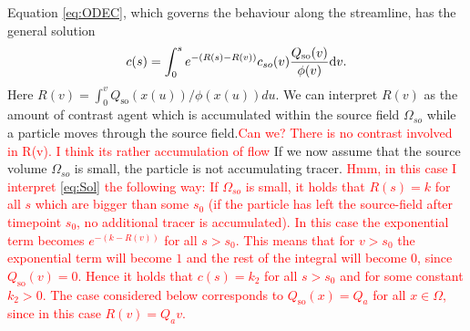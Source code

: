 \documentclass[paper=a4, fontsize=11pt,parskip=half,headings=small]{scrartcl}
\newcommand{\Qso}{Q_{\mathrm{so}}}
\begin{document}
Equation \eqref{eq:ODEC}, which governs the behaviour along the streamline, has the general solution
\begin{equation}\label{eq:Sol}
	c(s) = \int_{0}^{s} e^{-(R(s)-R(v))}c_{so}(v)\frac{\Qso(v)}{\phi(v)} \diff v.
\end{equation}
Here $R(v)=\int_{0}^v\Qso(x(u))/\phi(x(u)) d u$.
We can interpret $R(v)$ as the amount of contrast agent which is accumulated within the source field $\Omega_{so}$ while a particle moves through the source field.\textcolor{red}{Can we? There is no contrast involved in R(v). I think its rather accumulation of flow}
If we now assume that the source volume $\Omega_{so}$ is small, the particle is not accumulating tracer.
\textcolor{red}{Hmm, in this case I interpret \eqref{eq:Sol} the following way: If $\Omega_{so}$ is small, it holds that $R(s) = k$ for all $s$ which are bigger than some $s_0$ (if the particle has left the source-field after timepoint $s_0$, no additional tracer is accumulated). In this case the exponential term becomes $e^{-(k-R(v))}$ for all $s>s_0$. This means that for $v>s_0$ the exponential term will become $1$ and the rest of the integral will become $0$, since $\Qso(v)=0$. Hence it holds that $c(s) = k_2$ for all $s>s_0$ and for some constant $k_2>0$. The case considered below corresponds to $\Qso(x) = Q_a$ for all $x \in \Omega$, since in this case $R(v) = Q_av$.}
\end{document}
